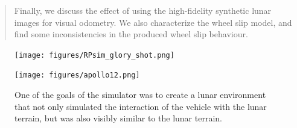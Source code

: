 \documentclass[twocolumn,letterpaper]{IEEEAerospaceCLS}  %
\begin{document}
\begin{abstract}

Finally, we discuss the effect of using the high-fidelity synthetic lunar images for visual odometry.
We also characterize the wheel slip model, and find some inconsistencies in the produced wheel slip behaviour.

\end{abstract}

\begin{figure}[htp]
\begin{subfloat}{
\texttt{[image: figures/RPsim\_glory\_shot.png]}
}
\end{subfloat}
\qquad
\begin{subfloat}{
\texttt{[image: figures/apollo12.png]}
}
\end{subfloat}
\caption{One of the goals of the simulator was to create a lunar environment that not only simulated the interaction of the vehicle with the lunar terrain, but was also visibly similar to the lunar terrain.\label{fig:sim-by-real}}
\end{figure}

\tableofcontents
\end{document}
